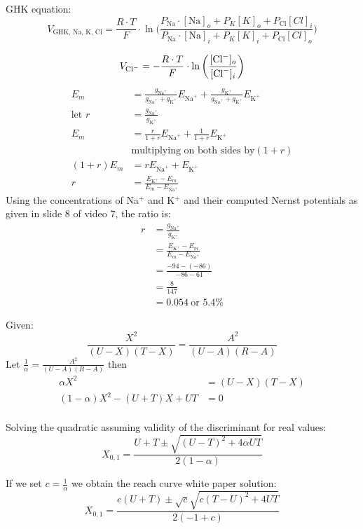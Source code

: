 \documentclass[12pt,twoside]{article}
\begin{document}
 GHK equation: 
 $$
 	V_{\text{GHK, Na, K, Cl}} = \frac{R \cdot T} {F} \cdot \ln \bigg( \frac{P_{\text{Na}} \cdot [\text{Na}]_o  + P_K [K]_o + P_{\text{Cl}} [Cl]_i} 
	{P_{\text{Na}} \cdot [\text{Na}]_i  + P_K [K]_i + P_{\text{Cl}} [Cl]_o} \bigg)
 $$
 
 $$
 	V_{\text{Cl}^-}	= -  \frac{R \cdot T} {F} \cdot \ln \bigg(   \frac{ [\text{Cl}^-]_o} {[\text{Cl}^-]_i}  \bigg)
 $$
 \begin{align*}
 	E_m	&= \frac{g_{\text{Na}^+}} {g_{\text{Na}^+} + g_{\text{K}^+}} E_{\text{Na}^+} +  \frac{g_{\text{K}^+}} {g_{\text{Na}^+} + g_{\text{K}^+}} E_{\text{K}^+} \\
	\text{let } r &=  \frac{g_{\text{Na}^+}} {g_{\text{K}^+}} \\
	E_m	&= \frac{r} {1+r} E_{\text{Na}^+} + \frac{1}{1+r} E_{\text{K}^+} \\
	& \text{multiplying on both sides by} (1+r) \\
	(1+r) E_m	&=   r E_{\text{Na}^+} + E_{\text{K}^+} \\
	r &= \frac{ E_{\text{K}^+}  -  E_m} {  E_m - E_{\text{Na}^+} }
 \end{align*}
Using the concentrations of Na$^+$ and K$^+$ and their computed Nernst potentials as given in slide 8 of video 7, the ratio is:
\begin{align*}
	r &= \frac{g_{\text{Na}^+}} {g_{\text{K}^+}}\\
	  &= \frac{ E_{\text{K}^+}  -  E_m} {  E_m - E_{\text{Na}^+} } \\
	  &= \frac{-94 - (-86)} {-86-61} \\
	  &= \frac{8}{147} \\
	  &= 0.054 ~ \text{or } 5.4\%
 \end{align*}

 
 Given:
 $$
 	\frac{X^2} {(U-X) (T-X)} = \frac{A^2} { (U-A) (R-A)}
 $$
 Let $\frac{1}{\alpha} =  \frac{A^2} { (U-A) (R-A)}$ then 
 \begin{align*}
 	\alpha X^2 	&=	(U-X) (T-X) \\
	(1-\alpha) X^2 - (U+T) X + UT &= 0 \\
  \end{align*}
  
Solving the quadratic assuming validity of the discriminant for real values:
$$
	X_{0,1} = \frac { U + T \pm \sqrt{ (U - T) ^2 + 4 \alpha U T}} {2 ( 1 - \alpha)}
$$

If we set $c = \frac{1}{\alpha}$ we obtain the reach curve white paper solution:
$$
	X_{0,1} = \frac { c (U + T) \pm \sqrt{c}  \sqrt{ c (T - U) ^2 + 4 U T}} {2 ( -1 + c)}
$$
\end{document}
